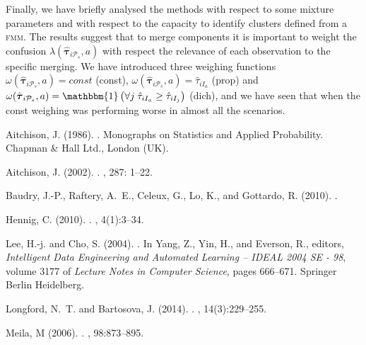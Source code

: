 \documentclass[10pt, a4paper]{article}
\newcommand{\m}[1]{\boldsymbol{#1}}
\newcommand{\fmm}{\textsc{fmm}\xspace}
\begin{document}
\begin{spacing}{1.9}
Finally, we have briefly analysed the methods with respect to some mixture parameters and with respect to the capacity to identify clusters defined from a \fmm. The results suggest that to merge components it is important to weight the confusion $\lambda(\hat{\m \tau}_{i \mathcal{P}_s}, a)$ with respect the relevance of each observation to the specific merging. We have introduced three weighing functions $\omega(\hat{\m \tau}_{i \mathcal{P}_s}, a) = const$ (const), $\omega(\hat{\m \tau}_{i \mathcal{P}_s}, a) = \hat{\tau}_{iI_a}$ (prop) and $\omega(\hat{\m \tau}_{i \mathcal{P}_s}, a) = \mathbbm{1}\left( \forall j\; \hat{\tau}_{i I_{a}} \geq \hat{\tau}_{iI_j} \right)$ (dich), and we have seen that when the const weighing was performing worse in almost all the scenarios.



\begin{thebibliography}{}

Aitchison, J. (1986).
.
\newblock Monographs on Statistics and Applied Probability. Chapman \& Hall
  Ltd., London (UK).

Aitchison, J. (2002).
.
, 287: 1--22.

Baudry, J.-P., Raftery, A.~E., Celeux, G., Lo, K., and Gottardo, R. (2010).
.

Hennig, C. (2010).
.
, 4(1):3--34.

Lee, H.-j. and Cho, S. (2004).
.
\newblock In Yang, Z., Yin, H., and Everson, R., editors, {\em Intelligent Data
  Engineering and Automated Learning – IDEAL 2004 SE - 98}, volume 3177 of
  {\em Lecture Notes in Computer Science}, pages 666--671. Springer Berlin
  Heidelberg.

Longford, N.~T. and Bartosova, J. (2014).
.
, 14(3):229--255.

Meila, M (2006).
.
, 98:873--895.


\end{thebibliography}
\end{spacing}
\end{document}
